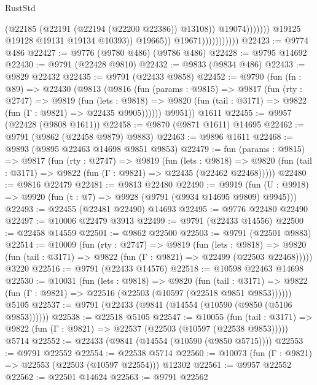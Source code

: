 \begin{lexlean}{RustStd}
\begin{coremodule}
                                                (@22185 (@22191 (@22194 (@22200 @22386)) @13108))
                                                @19074)))))))
                                  @19125
                                  @19128
                                  @19131
                                  @19134
                                  @10393))
                              @19665))
                          @19671)))))))))))
@22423 := @9774 @486
@22427 := @9776 (@9780 @486) (@9786 @486)
@22428 := @9795 @14692
@22430 := @9791 (@22428 @9810)
@22432 := @9833 (@9834 @486)
@22433 := @9829 @22432
@22435 := @9791 (@22433 @9858)
@22452 := @9790
    (fun (fn : @89) =>
    @22430
      (@9813
        (@9816
          (fun (params : @9815) =>
          @9817
            (fun (rty : @2747) =>
            @9819
              (fun (lets : @9818) =>
              @9820 (fun (tail : @3171) => @9822 (fun (Γ : @9821) => @22435 @9905))))))
        @9951))
    @1611
@22455 := @9957 (@22428 (@9808 @1611))
@22458 := @9870 (@9871 @1611) @14695
@22462 := @9791 (@9862 (@22458 @9879) @9883)
@22463 := @9896 @1611
@22468 := @9893 (@9895 @22463 @14698 @9851 @9853)
@22479 := fun (params : @9815) =>
  @9817
    (fun (rty : @2747) =>
    @9819
      (fun (lets : @9818) =>
      @9820 (fun (tail : @3171) => @9822 (fun (Γ : @9821) => @22435 (@22462 @22468)))))
@22480 := @9816 @22479
@22481 := @9813 @22480
@22490 := @9919
    (fun (U : @9918) => @9920 (fun (t : @7) => @9928 (@9791 (@9934 @14695 @9809) @9945)))
@22493 := @22455 (@22481 @22490) @14693
@22495 := @9776 @22480 @22490
@22497 := @10006 @22479 @3913
@22499 := @9791 (@22433 @14556)
@22500 := @22458 @14559
@22501 := @9862 @22500
@22503 := @9791 (@22501 @9883)
@22514 := @10009
    (fun (rty : @2747) =>
    @9819
      (fun (lets : @9818) =>
      @9820 (fun (tail : @3171) => @9822 (fun (Γ : @9821) => @22499 (@22503 @22468)))))
    @3220
@22516 := @9791 (@22433 @14576)
@22518 := @10598 @22463 @14698
@22530 := @10031
    (fun (lets : @9818) =>
    @9820
      (fun (tail : @3171) =>
      @9822 (fun (Γ : @9821) => @22516 (@22503 (@10597 (@22518 @9851 @9853))))))
    @5105
@22537 := @9791 (@22433 (@9841 (@14554 (@10590 (@9850 (@5106 @9853))))))
@22538 := @22518 @5105
@22547 := @10055
    (fun (tail : @3171) => @9822 (fun (Γ : @9821) => @22537 (@22503 (@10597 (@22538 @9853)))))
    @5714
@22552 := @22433 (@9841 (@14554 (@10590 (@9850 @5715))))
@22553 := @9791 @22552
@22554 := @22538 @5714
@22560 := @10073 (fun (Γ : @9821) => @22553 (@22503 (@10597 @22554))) @12302
@22561 := @9957 @22552
@22562 := @22501 @14624
@22563 := @9791 @22562

\end{coremodule}
\end{lexlean}
